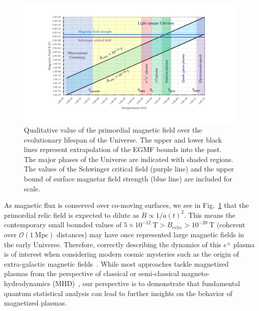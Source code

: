 \documentclass[universe,article,submit,moreauthors,pdftex,a4paper]{Definitions/mdpi}
\newcommand*{\rf}[1]{Fig.~{\ref{#1}}}
\begin{document}
\begin{figure}[htbp]
 \centering \includegraphics[trim=110 50 120 40,clip,width=\textwidth]{./plots/relic_plot.pdf}
 \caption{Qualitative value of the primordial magnetic field over the evolutionary lifespan of the Universe. The upper and lower black lines represent extrapolation of the EGMF bounds into the past. The major phases of the Universe are indicated with shaded regions. The values of the Schwinger critical field (purple line) and the upper bound of surface magnetar field strength (blue line) are included for scale.\label{relic_plot}}
\end{figure}

As magnetic flux is conserved over co-moving surfaces, we see in \rf{relic_plot} that the primordial relic field is expected to dilute as $B\propto1/a(t)^{2}$. This means the contemporary small bounded values of $5\times10^{-12}\ \mathrm{T}>B_{relic}>10^{-20}\ \mathrm{T}$ (coherent over $\mathcal{O}(1\ \mathrm{Mpc})$ distances) may have once represented large magnetic fields in the early Universe. Therefore, correctly describing the dynamics of this $e^{\pm}$ plasma is of interest when considering modern cosmic mysteries such as the origin of extra-galactic magnetic fields~\cite{Anchordoqui:2001bs,Neronov:2010gir}. While most approaches tackle magnetized plasmas from the perspective of classical or semi-classical magneto-hydrodynamics (MHD)~\cite{berezhiani1992influence,berezhiani1995large,Schlickeiser:2018hzq,melrose2008quantum}, our perspective is to demonstrate that fundamental quantum statistical analysis can lead to further insights on the behavior of magnetized plasmas.
\end{document}
